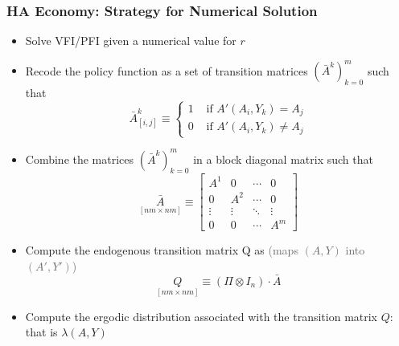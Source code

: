 \documentclass[10pt, aspectratio=1610, natbib, handout]{beamer}
\newcommand{\dimmer}[1]{\textcolor{dimgray}{#1}}
\begin{document}
  \begin{frame}
    \frametitle{HA Economy: Strategy for Numerical Solution}

    \begin{itemize}
      \item Solve VFI/PFI given a numerical value for $r$
      \item Recode the policy function as a set of transition matrices ${(\bar{A}^k)}_{k=0}^{m}$ such that
        \begin{equation*}
          \bar{A}^k_{[i, j]} \equiv
          \begin{cases}
            1 & \text{ if } A'(A_i, Y_k) = A_j \\
            0 & \text{ if } A'(A_i, Y_k) \neq A_j
          \end{cases}
        \end{equation*}
      \item Combine the matrices ${(\bar{A}^k)}_{k=0}^{m}$ in a block diagonal matrix such that
        \begin{equation*}
          \underset{[n m \times n m]}{\bar{A}} \equiv
          \begin{bmatrix}
            A^1 & 0 & \cdots & 0 \\
            0 & A^2 & \cdots & 0 \\
            \vdots & \vdots & \ddots & \vdots \\
            0 & 0 & \cdots & A^{m}
          \end{bmatrix}
        \end{equation*}
      \item Compute the endogenous transition matrix Q as \hfill\dimmer{(maps $(A, Y)$ into $(A', Y')$)}
        \begin{equation*}
          \underset{[n m \times n m]}{Q} \equiv (\Pi \otimes I_n) \cdot \bar{A}
        \end{equation*}
      \item Compute the ergodic distribution associated with the transition matrix $Q$: that is $\lambda(A, Y)$
    \end{itemize}

  \end{frame}
\end{document}

